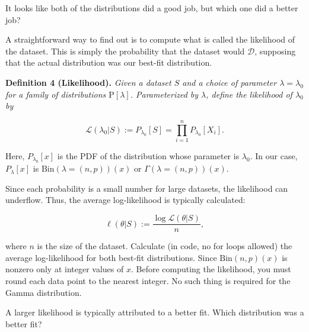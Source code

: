 \begin{tcolorbox}
    It looks like both of the distributions did a good job, but which one did a
    better job?
    
    A straightforward way to find out is to compute what is called the likelihood
    of the dataset. This is simply the probability that the dataset would
    $\mathcal{D}$, supposing that the actual distribution was our best-fit
    distribution.

    \vspace{10pt}
    \begin{mdframed}[backgroundcolor=lightblue, linecolor=blue, linewidth=1.5pt]
        \textbf{Definition 4 (Likelihood).}
        \textit{Given a dataset $S$ and a choice of parameter
        $\lambda = \lambda_0$ for a family of distributions $\text{P}[\lambda]$.
        Parameterized by $\lambda$, define the likelihood of $\lambda_0$ by}
        
        \begin{equation*}
           \mathcal{L}(\lambda_0 | S) := P_{\lambda_0}[S]
           = \prod_{i = 1}^{n} P_{\lambda_0}[X_i].
        \end{equation*}
    \end{mdframed}

    Here, $P_{\lambda_0}[x]$ is the PDF of the distribution whose parameter is
    $\lambda_0$. In our case, $P_{\lambda}[x]$ is
    $\text{Bin}(\lambda = (n, p))(x)$ or $\Gamma(\lambda = (n, p))(x)$.

    Since each probability is a small number for large datasets, the likelihood
    can underflow. Thus, the average log-likelihood is typically calculated:

    \begin{equation*}
        \ell(\theta | S) := \dfrac{\log{\mathcal{L}(\theta | S)}}{n},
    \end{equation*}

    where $n$ is the size of the dataset. Calculate (in code, no for loops
    allowed) the average log-likelihood for both best-fit distributions. Since
    $\text{Bin}(n, p)(x)$ is nonzero only at integer values of $x$. Before
    computing the likelihood, you must round each data point to the nearest 
    integer. No such thing is required for the Gamma distribution.
    
    A larger likelihood is typically attributed to a better fit. Which
    distribution was a better fit?
\end{tcolorbox}

